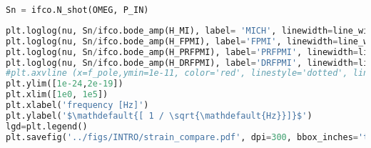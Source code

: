\begin{lstlisting}[frame=single, language=Python]
Sn = ifco.N_shot(OMEG, P_IN)
\end{lstlisting}

\begin{lstlisting}[frame=single, language=Python]
plt.loglog(nu, Sn/ifco.bode_amp(H_MI), label= 'MICH', linewidth=line_width)
plt.loglog(nu, Sn/ifco.bode_amp(H_FPMI), label='FPMI', linewidth=line_width)
plt.loglog(nu, Sn/ifco.bode_amp(H_PRFPMI), label='PRFPMI', linewidth=line_width)
plt.loglog(nu, Sn/ifco.bode_amp(H_DRFPMI), label='DRFPMI', linewidth=line_width)
#plt.axvline (x=f_pole,ymin=1e-11, color='red', linestyle='dotted', linewidth=3)
plt.ylim([1e-24,2e-19])
plt.xlim([1e0, 1e5])
plt.xlabel('frequency [Hz]')
plt.ylabel('$\mathdefault{[ 1 / \sqrt{\mathdefault{Hz}}]}$')
lgd=plt.legend()
plt.savefig('../figs/INTRO/strain_compare.pdf', dpi=300, bbox_inches='tight')
\end{lstlisting}

